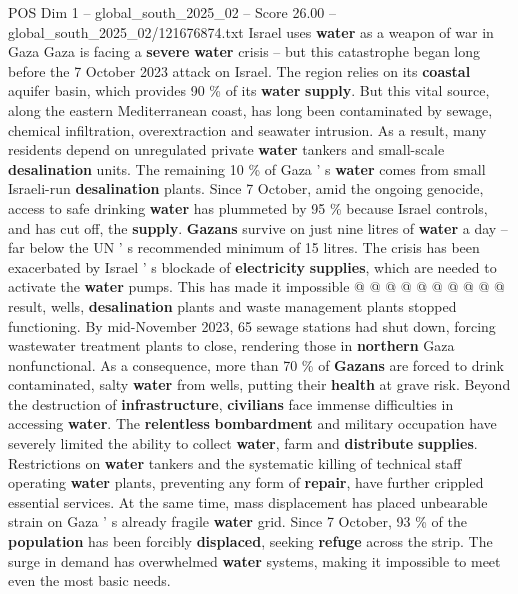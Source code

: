 \begin{textsample}{POS Dim 1 – global\_south\_2025\_02 – Score 26.00 – global\_south\_2025\_02/121676874.txt}  \label{ex:f1_pos_411}
Israel uses \textbf{water} as a weapon of war in Gaza Gaza is facing a \textbf{severe} \textbf{water} crisis -- but this catastrophe began long before the 7 October 2023 attack on Israel.
The region relies on its \textbf{coastal} aquifer basin, which provides 90 \% of its \textbf{water} \textbf{supply}.
But this vital source, along the eastern Mediterranean coast, has long been contaminated by sewage, chemical infiltration, overextraction and seawater intrusion.
As a result, many residents depend on unregulated private \textbf{water} tankers and small-scale \textbf{desalination} units.
The remaining 10 \% of Gaza ' s \textbf{water} comes from small Israeli-run \textbf{desalination} plants.
Since 7 October, amid the ongoing genocide, access to safe drinking \textbf{water} has plummeted by 95 \% because Israel controls, and has cut off, the \textbf{supply}. \textbf{Gazans} survive on just nine litres of \textbf{water} a day -- far below the UN ' s recommended minimum of 15 litres.
The crisis has been exacerbated by Israel ' s blockade of \textbf{electricity} \textbf{supplies}, which are needed to activate the \textbf{water} pumps.
This has made it impossible @ @ @ @ @ @ @ @ @ @ result, wells, \textbf{desalination} plants and waste management plants stopped functioning.
By mid-November 2023, 65 sewage stations had shut down, forcing wastewater treatment plants to close, rendering those in \textbf{northern} Gaza nonfunctional.
As a consequence, more than 70 \% of \textbf{Gazans} are forced to drink contaminated, salty \textbf{water} from wells, putting their \textbf{health} at grave risk.
Beyond the destruction of \textbf{infrastructure}, \textbf{civilians} face immense difficulties in accessing \textbf{water}.
The \textbf{relentless} \textbf{bombardment} and military occupation have severely limited the ability to collect \textbf{water}, farm and \textbf{distribute} \textbf{supplies}.
Restrictions on \textbf{water} tankers and the systematic killing of technical staff operating \textbf{water} plants, preventing any form of \textbf{repair}, have further crippled essential services.
At the same time, mass displacement has placed unbearable strain on Gaza ' s already fragile \textbf{water} grid.
Since 7 October, 93 \% of the \textbf{population} has been forcibly \textbf{displaced}, seeking \textbf{refuge} across the strip.
The surge in demand has overwhelmed \textbf{water} systems, making it impossible to meet even the most basic needs.

\end{textsample}
